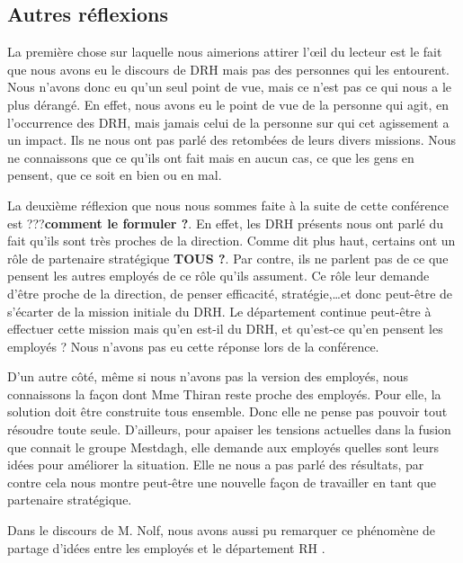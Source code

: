 \subsection{Autres réflexions}

La première chose sur laquelle nous aimerions attirer l'œil du lecteur est le fait que nous avons eu le discours de DRH mais pas des personnes qui les entourent. Nous n'avons donc eu qu'un seul point de vue, mais ce n'est pas ce qui nous a le plus dérangé. En effet, nous avons eu le point de vue de la personne qui agit, en l'occurrence des DRH, mais jamais celui de la personne sur qui cet agissement a un impact. Ils ne nous ont pas parlé des retombées de leurs divers missions. Nous ne connaissons que ce qu'ils ont fait mais en aucun cas, ce que les gens en pensent, que ce soit en bien ou en mal. \newline 

La deuxième réflexion que nous nous sommes faite à la suite de cette conférence est ???\textbf{comment le formuler ?}. En effet, les DRH présents nous ont parlé du fait qu'ils sont très proches de la direction. Comme dit plus haut, certains ont un rôle de partenaire stratégique \textbf{TOUS ?}. Par contre, ils ne parlent pas de ce que pensent les autres employés de ce rôle qu'ils assument. Ce rôle leur demande d'être proche de la direction, de penser efficacité, stratégie,\ldots et donc peut-être de s'écarter de la mission initiale du DRH. Le département continue peut-être à effectuer cette mission mais qu'en est-il du DRH, et qu'est-ce qu'en pensent les employés ? Nous n'avons pas eu cette réponse lors de la conférence. \newline

D'un autre côté, même si nous n'avons pas la version des employés, nous connaissons la façon dont Mme Thiran reste proche des employés. Pour elle, la solution doit être construite tous ensemble. Donc elle ne pense pas pouvoir tout résoudre toute seule. D'ailleurs, pour apaiser les tensions actuelles dans la fusion que connait le groupe Mestdagh, elle demande aux employés quelles sont leurs idées pour améliorer la situation. Elle ne nous a pas parlé des résultats, par contre cela nous montre peut-être une nouvelle façon de travailler en tant que partenaire stratégique. \newline

Dans le discours de M. Nolf, nous avons aussi pu remarquer ce phénomène de partage d'idées entre les employés et le département RH . \\

